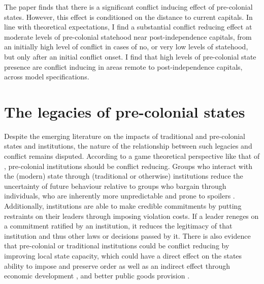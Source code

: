 \documentclass[12pt]{article}
\begin{document}
The paper finds that there is a significant conflict inducing effect of
pre-colonial states. However, this effect is conditioned on the distance to
current capitals. In line with theoretical expectations, I find a substantial
conflict reducing effect at moderate levels of pre-colonial statehood near
post-independence capitals, from an initially high level of conflict in cases of
no, or very low levels of statehood, but only after an initial conflict onset. I
find that high levels of pre-colonial state presence are conflict inducing in
areas remote to post-independence capitals, across model specifications.

\section{The legacies of pre-colonial states}
\label{The legacies of pre-colonial states}

Despite the emerging literature on the impacts of traditional and pre-colonial
states and institutions, the nature of the relationship between such legacies
and conflict remains disputed. According to a game theoretical perspective like
that of \citet{Fearon1995}, pre-colonial institutions should be conflict
reducing. Groups who interact with the (modern) state through (traditional or
otherwise) institutions reduce the uncertainty of future behaviour relative to
groups who bargain through individuals, who are inherently more unpredictable
and prone to spoilers \citep{Wig2016}. Additionally, institutions are able to
make credible commitments by putting restraints on their leaders through
imposing violation costs. If a leader reneges on a commitment ratified by an
institution, it reduces the legitimacy of that institution and thus other laws
or decisions passed by it. There is also evidence that pre-colonial or
traditional institutions could be conflict reducing by improving local state
capacity, which could have a direct effect on the states ability to impose and
preserve order as well as an indirect effect through economic development
\citep{Depetris-Chauvin2016}, and better public goods provision
\citep{Wilfahrt_2021}. 
\end{document}
